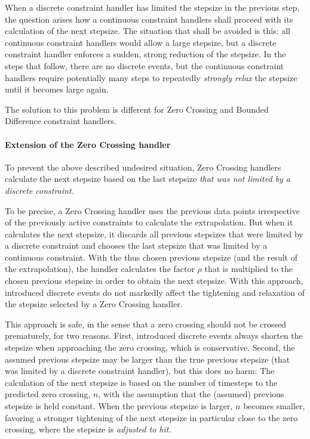 When a discrete constraint handler has limited the stepsize in the previous step, the question arises how a continuous constraint handlers shall proceed with its calculation of the next stepsize. The situation that shall be avoided is this: all continuous constraint handlers would allow a large stepsize, but a discrete constraint handler enforces a sudden, strong reduction of the stepsize. In the steps that follow, there are no discrete events, but the continuous constraint handlers require potentially many steps to repeatedly \textit{strongly relax} the stepsize until it becomes large again.

\noindent The solution to this problem is different for Zero Crossing and Bounded Difference constraint handlers.

\paragraph{Extension of the Zero Crossing handler}

To prevent the above described undesired situation, Zero Crossing handlers calculate the next stepsize based on the last stepsize \textit{that was not limited by a discrete constraint.}

\noindent To be precise, a Zero Crossing handler uses the previous data points irrespective of the previously active constraints to calculate the extrapolation. But when it calculates the next stepsize, it discards all previous stepsizes that were limited by a discrete constraint and chooses the last stepsize that was limited by a continuous constraint. With the thus chosen previous stepsize (and the result of the extrapolation), the handler calculates the factor $\rho$ that is multiplied to the chosen previous stepsize in order to obtain the next stepsize. With this approach, introduced discrete events do not markedly affect the tightening and relaxation of the stepsize selected by a Zero Crossing handler.

\noindent This approach is safe, in the sense that a zero crossing should not be crossed prematurely, for two reasons. First, introduced discrete events always shorten the stepsize when approaching the zero crossing, which is conservative. Second, the assumed previous stepsize may be larger than the true previous stepsize (that was limited by a discrete constraint handler), but this does no harm: The calculation of the next stepsize is based on the number of timesteps to the predicted zero crossing, $n$, with the assumption that the (assumed) previous stepsize is held constant. When the previous stepsize is larger, $n$ becomes smaller, favoring a stronger tightening of the next stepsize in particular close to the zero crossing, where the stepsize is \textit{adjusted to hit}.


